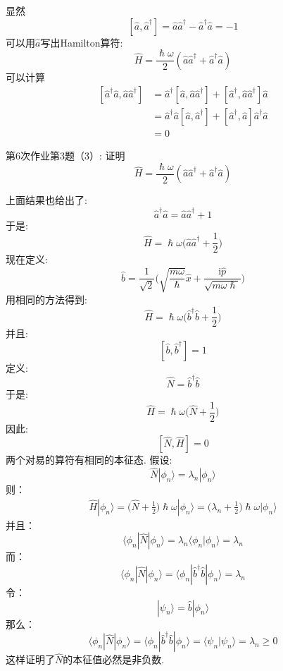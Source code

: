         显然
        \[ [\hat{a},\hat{a}^\dagger] = \hat{a}\hat{a}^\dagger - \hat{a}^\dagger \hat{a} =  -1 \]
        可以用$\hat{a}$写出Hamilton算符: 
        \[ \hat{H} = \frac {\hslash \omega}2 (\hat{a}\hat{a}^\dagger + \hat{a}^\dagger \hat{a}) \]
        可以计算
        \begin{equation}\begin{aligned}
            \left[\hat{a}^\dagger\hat{a}, \hat{a}\hat{a}^\dagger\right] &= \hat{a}^\dagger [\hat{a},\hat{a}\hat{a}^\dagger] +  [\hat{a}^\dagger,\hat{a}\hat{a}^\dagger]\hat{a}\\
            &= \hat{a}^\dagger\hat{a}[\hat{a},\hat{a}^\dagger] + [\hat{a}^\dagger,\hat{a}]\hat{a}^\dagger \hat{a}\\
            &= 0
        \end{aligned}\end{equation}
        \begin{asg}
            第6次作业第3题（3）: 证明
            \[ \hat{H} = \frac {\hslash \omega}2 (\hat{a}\hat{a}^\dagger + \hat{a}^\dagger \hat{a}) \]
        \end{asg}
        上面结果也给出了:
        \[ \hat{a}^\dagger\hat{a} = \hat{a}\hat{a}^\dagger + 1 \]
        于是:
        \[ \hat{H} = \hslash \omega\bigg(\hat{a}\hat{a}^\dagger + \frac 12\bigg)\]
        现在定义:
        \[ \hat{b} = \frac 1{\sqrt{2}}\bigg(\sqrt{\frac {m\omega}{\hslash}}\hat{x} + \frac {\mathrm{i}\hat{p}}{\sqrt{m\omega\hslash}}\bigg) \]
        用相同的方法得到:
        \[ \hat{H} = \hslash \omega\bigg(\hat{b}^\dagger\hat{b}+ \frac 12\bigg) \]
        并且:
        \[ [\hat{b}, \hat{b}^\dagger] = 1 \]
        定义:
        \[ \hat{N} = \hat{b}^\dagger\hat{b} \]
        于是:
        \[ \hat{H} = \hslash \omega \bigg(\hat{N}+\frac 12\bigg) \]
        因此:
        \[ [\hat{N},\hat{H}] = 0 \]
        两个对易的算符有相同的本征态. 假设:
        \[ \hat{N}|\phi_n \rangle = \lambda_n |\phi_n \rangle \]
        则：
        \begin{equation}\begin{aligned}
            \hat{H}|\phi_n \rangle = \bigg(\hat{N}+\frac 12\bigg)\hslash\omega|\phi_n \rangle = \bigg(\lambda_n + \frac 12\bigg)\hslash\omega|\phi_n\rangle
        \end{aligned}\end{equation}
        并且：
        \[ \langle \phi_n|\hat{N}|\phi_n \rangle = \lambda_n \langle \phi_n |\phi_n \rangle = \lambda_n \]
        而：
        \[ \langle \phi_n|\hat{N}|\phi_n \rangle =  \langle \phi_n |\hat{b}^\dagger\hat{b}|\phi_n \rangle = \lambda_n \]
        令：
        \[ |\psi_n \rangle = \hat{b}|\phi_n\rangle \]
        那么：
        \[ \langle \phi_n|\hat{N}|\phi_n \rangle =  \langle \phi_n |\hat{b}^\dagger\hat{b}|\phi_n \rangle = \langle \psi_n|\psi_n \rangle = \lambda_n \geqslant 0 \]
        这样证明了$\hat{N}$的本征值必然是非负数.

